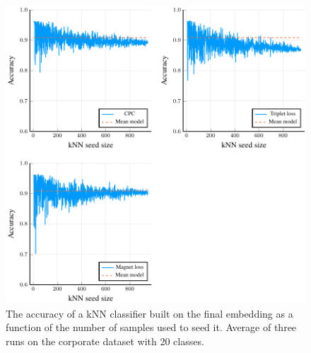 \begin{figure}
  \centering
  \includegraphics[width=\textwidth]{images/cisco-multiclass/kNN/cisco-multiclass-kNN.pdf}
  \caption{The accuracy of a kNN classifier built on the final embedding as a function of the number of samples used to seed it. Average of three runs on the corporate dataset with 20 classes.}\label{fig:cisco-kNN}
\end{figure}

